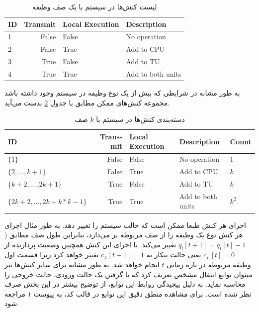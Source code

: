 \begin{table}[H]
	\centering
	\begin{latin}
		\begin{tabular}{@{}lrll@{}}
			\toprule
			\textbf{ID} & \textbf{Transmit} & \textbf{Local Execution} & \textbf{Description} \\ \midrule
			1           & False             & False                    & No operation         \\
			2           & False             & True                     & Add to CPU           \\
			3           & True              & False                    & Add to TU            \\
			4           & True              & True                     & Add to both units    \\ \bottomrule
		\end{tabular}
	\end{latin}
	\caption{لیست کنش‌ها در سیستم با یک صف وظیفه}
	\label{table:actions}
\end{table}
به طور مشابه در شرایطی که بیش از یک نوع وظیفه در سیستم وجود داشته باشد مجموعه کنش‌های ممکن مطابق با جدول \ref{table:actions-multiqueue} بدست می‌آید.
\begin{table}[H]
	\centering
	\begin{latin}
		\begin{tabular}{@{}lrlll@{}}
			\toprule
			\textbf{ID}                     & \textbf{Transmit} & \textbf{Local Execution} & \textbf{Description} & \textbf{Count}                \\ \midrule
			$\{1\}$                           & False             & False                    & No operation         & 1                    \\
			$\{2, ..., k + 1\}$               & False             & True                     & Add to CPU           & $k$                    \\
			$\{k + 2, ..., 2k + 1\}$          & True              & False                    & Add to TU            & $k$                    \\
			$\{2k + 2, ..., 2k + k * k - 1\}$ & True              & True                     & Add to both units    & $k^2$ \\ \bottomrule
		\end{tabular}
	\end{latin}
	\caption{دسته‌بندی کنش‌ها در سیستم با $k$ صف}
	\label{table:actions-multiqueue}
\end{table}
اجرای هر کنش طبعا ممکن است که حالت سیستم را تغییر دهد. به طور مثال اجرای هر کنش نوع  یک وظیفه را از صف مربوطه بر می‌دارد، بنابراین طول صف مطابق (\(q_i[t + 1] = q_i[t] - 1\) تغییر می‌کند. با اجرای این کنش همچنین وضعیت پردازنده از \(c_L[t] = 0\) یعنی حالت بیکار به \(c_L[t + 1] = 1\) تغییر خواهد کرد زیرا قسمت اول وظیفه مربوطه در بازه زمانی \(t\) انجام خواهد شد. به طور مشابه برای سایر کنش‌ها نیز میتوان توابع انتقال مشخص تعریف کرد که با گرفتن یک حالت ورودی، حالت خروجی را محاسبه نماید. به دلیل پیچیدگی روابط این توابع، از توضیح بیشتر در این بخش صرف نظر شده است. برای مشاهده منطق دقیق این توابع در قالب کد، به پیوست ۱ مراجعه شود.
